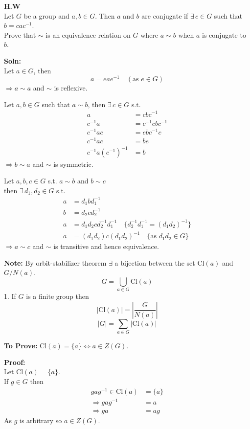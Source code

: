 \documentclass[11pt]{article}
\begin{document}
\bigskip
\noindent \textbf{H.W} \\
Let $G$ be a group and $a, b \in G$. Then $a$ and $b$ are conjugate if $\exists\, c \in G$ such that $b = c a c^{-1}$. \\
Prove that $\sim$ is an equivalence relation on $G$ where $a \sim b$ when $a$ is conjugate to $b$.

\medskip
\noindent \textbf{Soln:} \\
Let $a \in G$, then
\[
a = e a e^{-1} \quad (\text{as } e \in G)
\]
$\Rightarrow a \sim a$ and $\sim$ is reflexive.

\newpage
\noindent Let $a, b \in G$ such that $a \sim b$, then $\exists\, c \in G$ s.t.
\begin{align*}
a &= c b c^{-1}  \\
c^{-1} a &= c^{-1} c b c^{-1}  \\
c^{-1} a c &= e b c^{-1} c  \\
c^{-1} a c &= b e  \\
c^{-1} a (c^{-1})^{-1} &= b
\end{align*}
$\Rightarrow b \sim a$ and $\sim$ is symmetric.

\noindent Let $a, b, c \in G$ s.t. $a \sim b$ and $b \sim c$ \\
then $\exists\, d_1, d_2 \in G$ s.t.
\begin{align*}
a &= d_1 b d_1^{-1}  \\
b &= d_2 c d_2^{-1}  \\
a &= d_1 d_2 c d_2^{-1} d_1^{-1} \quad \{d_2^{-1} d_1^{-1} = (d_1 d_2)^{-1}\}  \\
a &= (d_1 d_2) c (d_1 d_2)^{-1} \quad \{\text{as } d_1 d_2 \in G\}
\end{align*}
$\Rightarrow a \sim c$ and $\sim$ is transitive and hence equivalence.

\bigskip
\noindent \textbf{Note:} By orbit-stabilizer theorem $\exists$ a bijection between the set $\text{Cl}(a)$ and $G/N(a)$.
\[
G = \bigcup_{a \in G} \text{Cl}(a)
\]
1. If $G$ is a finite group then
\[
|\text{Cl}(a)| = \left|\frac{G}{N(a)}\right|
\]
\[
|G| = \sum_{a \in G} |\text{Cl}(a)|
\]

\bigskip
\noindent \textbf{To Prove:} $\text{Cl}(a) = \{a\} \iff a \in Z(G)$.

\newpage
\noindent \textbf{Proof:} \\
Let $\text{Cl}(a) = \{a\}$. \\
If $g \in G$ then
\begin{align*}
gag^{-1} \in \text{Cl}(a) &= \{a\}  \\
\Rightarrow gag^{-1} &= a  \\
\Rightarrow ga &= ag
\end{align*}
As $g$ is arbitrary so $a \in Z(G)$.
\end{document}
